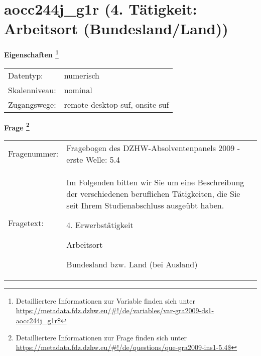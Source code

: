
    \setcounter{footnote}{0}

    \vspace*{-1.8cm}
	\section{aocc244j\_g1r (4. Tätigkeit: Arbeitsort (Bundesland/Land))}
	\label{section:aocc244j_g1r}



    \vspace*{0.5cm}
    \noindent\textbf{Eigenschaften
	\footnote{Detailliertere Informationen zur Variable finden sich unter
		\url{https://metadata.fdz.dzhw.eu/\#!/de/variables/var-gra2009-ds1-aocc244j_g1r$}}}\\
	\begin{tabularx}{\hsize}{@{}lX}
	Datentyp: & numerisch \\
	Skalenniveau: & nominal \\
	Zugangswege: &
	  remote-desktop-suf, 
	  onsite-suf
 \\
    \end{tabularx}



				\vspace*{0.5cm}
                \noindent\textbf{Frage
	                \footnote{Detailliertere Informationen zur Frage finden sich unter
		              \url{https://metadata.fdz.dzhw.eu/\#!/de/questions/que-gra2009-ins1-5.4$}}}\\
				\begin{tabularx}{\hsize}{@{}lX}
					Fragenummer: &
					  Fragebogen des DZHW-Absolventenpanels 2009 - erste Welle:
					  5.4
 \\
					Fragetext: & Im Folgenden bitten wir Sie um eine Beschreibung der verschiedenen beruflichen Tätigkeiten, die Sie seit Ihrem Studienabschluss ausgeübt haben.\par  4. Erwerbstätigkeit\par  Arbeitsort\par  Bundesland bzw. Land (bei Ausland) \\
				\end{tabularx}





